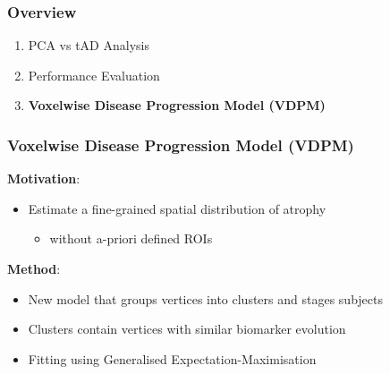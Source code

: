 \documentclass[10pt,xcolor=table]{beamer}
\begin{document}
\begin{frame}
\frametitle{Overview}

\begin{enumerate}
 \item PCA vs tAD Analysis
 \item Performance Evaluation
 \item \textbf{Voxelwise Disease Progression Model (VDPM)}
\end{enumerate}

\end{frame}

\begin{frame}
\frametitle{Voxelwise Disease Progression Model (VDPM)}

\textbf{Motivation}:
\begin{itemize}
 \item Estimate a fine-grained spatial distribution of atrophy 
 \begin{itemize}
  \item without a-priori defined ROIs
 \end{itemize}
\end{itemize}

\textbf{Method}:
\begin{itemize}
 \item New model that groups vertices into clusters and stages subjects
 \item Clusters contain vertices with similar biomarker evolution
 \item Fitting using Generalised Expectation-Maximisation
\end{itemize}

\end{frame}

% 
% 
% 
\end{document}
